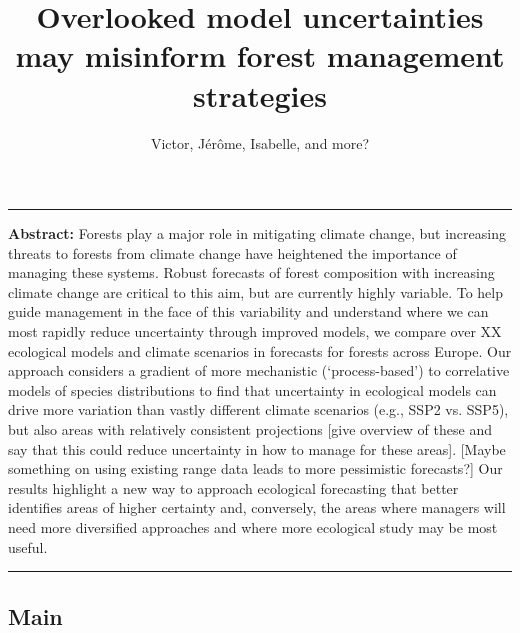 \documentclass[11pt,letter]{article}
\begin{document}
\title{Overlooked model uncertainties may misinform forest management strategies}

\author{Victor, Jérôme, Isabelle, and more?}
\date{}
\maketitle 


\noindent\rule{\textwidth}{0.3pt}
\textbf{Abstract:} Forests play a major role in mitigating climate change, but increasing threats to forests from climate change have heightened the importance of managing these systems. Robust forecasts of forest composition with increasing climate change are critical to this aim, but are currently highly variable. To help guide management in the face of this variability and understand where we can most rapidly reduce uncertainty through improved models, we compare over XX ecological models and climate scenarios in forecasts for forests across Europe. Our approach considers a gradient of more mechanistic (`process-based') to correlative models of species distributions to find that uncertainty in ecological models can drive more variation than vastly different climate scenarios (e.g., SSP2 vs. SSP5), but also areas with relatively consistent projections [give overview of these and say that this could reduce uncertainty in how to manage for these areas]. [Maybe something on using existing range data leads to more pessimistic forecasts?] Our results highlight a new way to approach ecological forecasting that better identifies areas of higher certainty and, conversely, the areas where managers will need more diversified approaches and where more ecological study may be most useful.

\noindent\rule{\textwidth}{0.3pt}

\linenumbers

\subsection*{Main}
%
\end{document}
